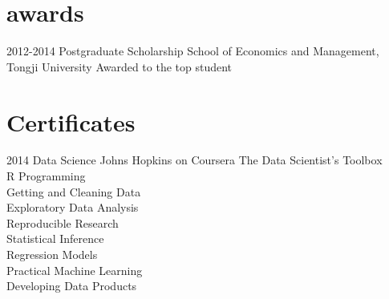 \documentclass[]{friggeri-cv} %
\begin{document}

\section{awards}

\begin{entrylist}
\entry
{2012-2014}
{Postgraduate Scholarship}
{School of Economics and Management, Tongji University}
{Awarded to the top student}
\end{entrylist}


\section{Certificates}

\begin{entrylist}
\entry
{2014}
{Data Science}
{Johns Hopkins on Coursera}
{The Data Scientist's Toolbox\\
R Programming\\
Getting and Cleaning Data\\
Exploratory Data Analysis\\
Reproducible Research\\
Statistical Inference\\
Regression Models\\
Practical Machine Learning\\
Developing Data Products}
\end{entrylist}

\end{document}
